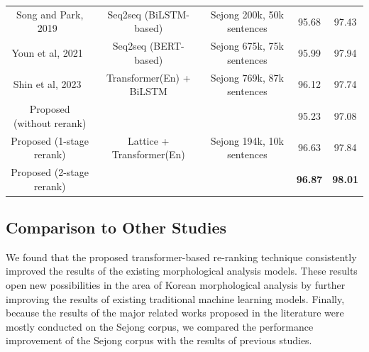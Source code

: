 \documentclass[AMS,STIX2COL]{WileyNJD-v2}
\begin{document}
\begin{table}[]
\begin{tabular*}{500pt}{@{\extracolsep\fill}ccc|cc@{\extracolsep\fill}}
            Song and Park, 2019~\cite{SongHJ2019} & Seq2seq (BiLSTM-based)                     & Sejong 200k, 50k sentences                  & 95.68                      & 97.43                        \\
            Youn et al, 2021~\cite{YounJY2021}    & Seq2seq (BERT-based)                       & Sejong 675k, 75k sentences                  & 95.99                      & 97.94                        \\
            Shin et al, 2023~\cite{ShinHJ2023}    & Transformer(En) + BiLSTM                   & Sejong 769k, 87k sentences                  & 96.12                      & 97.74                        \\
            \midrule
            Proposed (without rerank)             & \multirow{3}{*}{Lattice + Transformer(En)} & \multirow{3}{*}{Sejong 194k, 10k sentences} & 95.23                      & 97.08                        \\
            Proposed (1-stage rerank)             & ~                                          & ~                                           & 96.63                      & 97.84                        \\
            Proposed (2-stage rerank)             & ~                                          & ~                                           & \textbf{96.87}             & \textbf{98.01}               \\
            \bottomrule
        \end{tabular*}
    \end{table}

    \subsection{Comparison to Other Studies}\label{subsec5.5}

    We found that the proposed transformer-based re-ranking technique consistently improved the results of the existing morphological analysis models.
    These results open new possibilities in the area of Korean morphological analysis by further improving the results of existing traditional machine learning models.
    Finally, because the results of the major related works proposed in the literature were mostly conducted on the Sejong corpus, we compared the performance improvement of the Sejong corpus with the results of previous studies.
\end{document}
